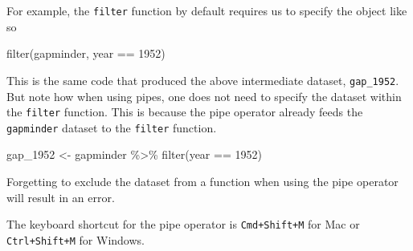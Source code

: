 \documentclass[
]{book}
\makeatletter
\newenvironment{Shaded}{\begin{snugshade}}{\end{snugshade}}
\newcommand{\AttributeTok}[1]{\textcolor[rgb]{0.61,0.61,0.61}{#1}}
\newcommand{\DecValTok}[1]{\textcolor[rgb]{0.06,0.06,0.06}{#1}}
\newcommand{\FunctionTok}[1]{\textcolor[rgb]{0,0,0}{#1}}
\newcommand{\NormalTok}[1]{#1}
\newcommand{\OtherTok}[1]{\textcolor[rgb]{0.37,0.37,0.37}{#1}}
\newcommand{\SpecialCharTok}[1]{\textcolor[rgb]{0,0,0}{#1}}
\newcommand{\StringTok}[1]{\textcolor[rgb]{0.5,0.5,0.5}{#1}}
\newenvironment{kframe}{%
\medskip{}
\setlength{\fboxsep}{.8em}
 \def\at@end@of@kframe{}%
 \ifinner\ifhmode%
  \def\at@end@of@kframe{\end{minipage}}%
  \begin{minipage}{\columnwidth}%
 \fi\fi%
 \def\FrameCommand##1{\hskip\@totalleftmargin \hskip-\fboxsep
 \colorbox{shadecolor}{##1}\hskip-\fboxsep
     \hskip-\linewidth \hskip-\@totalleftmargin \hskip\columnwidth}%
 \MakeFramed {\advance\hsize-\width
   \@totalleftmargin\z@ \linewidth\hsize
   \@setminipage}}%
 {\par\unskip\endMakeFramed%
 \at@end@of@kframe}
\renewenvironment{Shaded}{\begin{kframe}}{\end{kframe}}
\makeatother
\begin{document}
For example, the \texttt{filter} function by default requires us to specify the object like so

\begin{Shaded}
\begin{Highlighting}[]
\FunctionTok{filter}\NormalTok{(gapminder, year }\SpecialCharTok{==} \DecValTok{1952}\NormalTok{)}
\end{Highlighting}
\end{Shaded}

This is the same code that produced the above intermediate dataset, \texttt{gap\_1952}. But note how when using pipes, one does not need to specify the dataset within the \texttt{filter} function. This is because the pipe operator already feeds the \texttt{gapminder} dataset to the \texttt{filter} function.

\begin{Shaded}
\begin{Highlighting}[]
\NormalTok{gap\_1952 }\OtherTok{\textless{}{-}}\NormalTok{ gapminder }\SpecialCharTok{\%\textgreater{}\%} 
  \FunctionTok{filter}\NormalTok{(year }\SpecialCharTok{==} \DecValTok{1952}\NormalTok{)}
\end{Highlighting}
\end{Shaded}

Forgetting to exclude the dataset from a function when using the pipe operator will result in an error.

\begin{Shaded}
\end{Shaded}

The keyboard shortcut for the pipe operator is \texttt{Cmd+Shift+M} for Mac or \texttt{Ctrl+Shift+M} for Windows.
\end{document}
